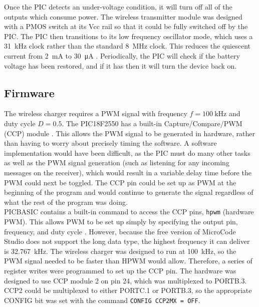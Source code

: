 Once the PIC detects an under-voltage condition, it will turn off all of the outputs which consume power. The wireless transmitter module was designed with a PMOS switch at its Vcc rail so that it could be fully switched off by the PIC. The PIC then transitions to its low frequency oscillator mode, which uses a \SI{31}{\kilo\hertz} clock rather than the standard \SI{8}{\mega\hertz} clock. This reduces the quiescent current from \SI{2}{\milli\ampere} to \SI{30}{\micro\ampere} \cite{pic16f688}. Periodically, the PIC will check if the battery voltage has been restored, and if it has then it will turn the device back on.\\





\subsection{Firmware}
The wireless charger requires a PWM signal with frequency $f=\SI{100}{\kilo\hertz}$ and duty cycle $D=0.5$. The PIC18F2550 has a built-in Capture/Compare/PWM (CCP) module \cite{pic18f2550}. This allows the PWM signal to be generated in hardware, rather than having to worry about precisely timing the software. A software implementation would have been difficult, as the PIC must do many other tasks as well as the PWM signal generation (such as listening for any incoming messages on the receiver), which would result in a variable delay time before the PWM could next be toggled. The CCP pin could be set up as PWM at the beginning of the program and would continue to generate the signal regardless of what the rest of the program was doing.\\

PICBASIC contains a built-in command to access the CCP pins, \verb|hpwm| (hardware PWM). This allows PWM to be set up simply by specifying the output pin, frequency, and duty cycle \cite{picbasic_pro}. However, because the free version of MicroCode Studio does not support the long data type, the highest frequency it can deliver is \SI{32.767}{\kilo\hertz}. The wireless charger was designed to run at \SI{100}{\kilo\hertz}, so the PWM signal needed to be faster than HPWM would allow. Therefore, a series of register writes were programmed to set up the CCP pin. The hardware was designed to use CCP module 2 on pin 24, which was multiplexed to PORTB.3. CCP2 could be multiplexed to either PORTC.1 or PORTB.3, so the appropriate CONFIG bit was set with the command \verb|CONFIG CCP2MX = OFF|.\\

